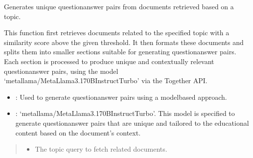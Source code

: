 \documentclass[letterpaper,10pt,english,openany,oneside]{sphinxmanual}
\begin{document}
\begin{fulllineitems}
\label{\detokenize{generation:tools.pipeline.generate_question_answer_pairs_open_source_json}}
\pysigstartsignatures
{}
\pysigstopsignatures
\sphinxAtStartPar
Generates unique question\sphinxhyphen{}answer pairs from documents retrieved based on a topic.

\sphinxAtStartPar
This function first retrieves documents related to the specified topic with a similarity score above the given threshold.
It then formats these documents and splits them into smaller sections suitable for generating question\sphinxhyphen{}answer pairs.
Each section is processed to produce unique and contextually relevant question\sphinxhyphen{}answer pairs, using the model
‘meta\sphinxhyphen{}llama/Meta\sphinxhyphen{}Llama\sphinxhyphen{}3.1\sphinxhyphen{}70B\sphinxhyphen{}Instruct\sphinxhyphen{}Turbo’ via the Together API.
\begin{description}
\begin{itemize}
\item {} 
\sphinxAtStartPar
{}: Used to generate question\sphinxhyphen{}answer pairs using a model\sphinxhyphen{}based approach.

\item {} 
\sphinxAtStartPar
{}: ‘meta\sphinxhyphen{}llama/Meta\sphinxhyphen{}Llama\sphinxhyphen{}3.1\sphinxhyphen{}70B\sphinxhyphen{}Instruct\sphinxhyphen{}Turbo’. This model is specified to generate question\sphinxhyphen{}answer
pairs that are unique and tailored to the educational content based on the document’s context.

\end{itemize}

\end{description}
\begin{quote}\begin{description}
\begin{itemize}
\item {} 
\sphinxAtStartPar
{} \textendash{} The topic query to fetch related documents.


\end{itemize}
\end{description}
\end{quote}
\end{fulllineitems}
\end{document}
